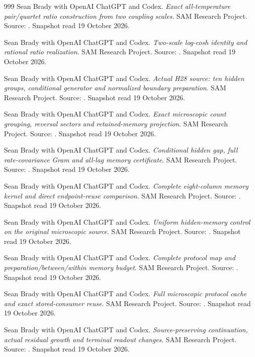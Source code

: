 \begin{thebibliography}{999}
 Sean Brady with OpenAI ChatGPT and Codex. \emph{Exact all-temperature pair/quartet ratio construction from two coupling scales}. SAM Research Project. Source: . Snapshot read 19 October 2026.

 Sean Brady with OpenAI ChatGPT and Codex. \emph{Two-scale log-cosh identity and rational ratio realization}. SAM Research Project. Source: . Snapshot read 19 October 2026.

 Sean Brady with OpenAI ChatGPT and Codex. \emph{Actual H28 source: ten hidden groups, conditional generator and normalized boundary preparation}. SAM Research Project. Source: . Snapshot read 19 October 2026.

 Sean Brady with OpenAI ChatGPT and Codex. \emph{Exact microscopic count grouping, reversal sectors and retained-memory projection}. SAM Research Project. Source: . Snapshot read 19 October 2026.

 Sean Brady with OpenAI ChatGPT and Codex. \emph{Conditional hidden gap, full rate-covariance Gram and all-lag memory certificate}. SAM Research Project. Source: . Snapshot read 19 October 2026.

 Sean Brady with OpenAI ChatGPT and Codex. \emph{Complete eight-column memory kernel and direct endpoint-reuse comparison}. SAM Research Project. Source: . Snapshot read 19 October 2026.

 Sean Brady with OpenAI ChatGPT and Codex. \emph{Uniform hidden-memory control on the original microscopic source}. SAM Research Project. Source: . Snapshot read 19 October 2026.

 Sean Brady with OpenAI ChatGPT and Codex. \emph{Complete protocol map and preparation/between/within memory budget}. SAM Research Project. Source: . Snapshot read 19 October 2026.

 Sean Brady with OpenAI ChatGPT and Codex. \emph{Full microscopic protocol cache and exact stored-consumer reuse}. SAM Research Project. Source: . Snapshot read 19 October 2026.

 Sean Brady with OpenAI ChatGPT and Codex. \emph{Source-preserving continuation, actual residual growth and terminal readout changes}. SAM Research Project. Source: . Snapshot read 19 October 2026.


\end{thebibliography}
